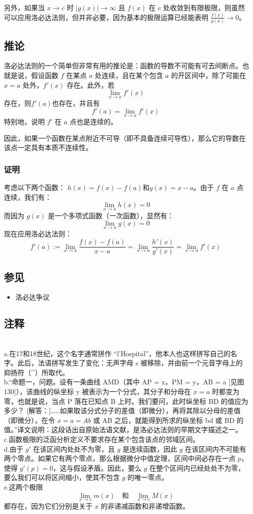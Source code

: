 另外，如果当 $x \to c$ 时 $|g(x)| \to \infty$ 且 $f(x)$ 在 $c$ 处收敛到有限极限，则虽然可以应用洛必达法则，但并非必要，因为基本的极限运算已经能表明 $\frac{f(x)}{g(x)} \to 0$。
\subsection{推论}
洛必达法则的一个简单但非常有用的推论是：函数的导数不可能有可去间断点。也就是说，假设函数 $f$ 在某点 $a$ 处连续，且在某个包含 $a$ 的开区间中，除了可能在 $x = a$ 处外，$f'(x)$ 存在。此外，若
$$
\lim_{x \to a} f'(x)~
$$
存在，则$f'(a)$也存在，并且有
$$
f'(a) = \lim_{x \to a} f'(x)~
$$
特别地，说明 $f'$ 在 $a$ 点也是连续的。

因此，如果一个函数在某点附近不可导（即不具备连续可导性），那么它的导数在该点一定具有本质不连续性。
\subsubsection{证明}
考虑以下两个函数： $h(x) = f(x) - f(a)$和$g(x) = x - a$。由于 $f$ 在 $a$ 点连续，我们有：
$$
\lim_{x \to a} h(x) = 0~
$$
而因为 $g(x)$ 是一个多项式函数（一次函数），显然有：
$$
\lim_{x \to a} g(x) = 0~
$$
现在应用洛必达法则：
$$
f'(a) := \lim_{x \to a} \frac{f(x) - f(a)}{x - a} = \lim_{x \to a} \frac{h'(x)}{g'(x)} = \lim_{x \to a} f'(x)~
$$
\subsection{参见}
\begin{itemize}
\item 洛必达争议
\end{itemize}
\subsection{注释}\\
a.在17和18世纪，这个名字通常拼作 “l'Hospital”，他本人也这样拼写自己的名字。此后，法语拼写发生了变化：无声字母 s 被移除，并由前一个元音字母上的抑扬符（^）所取代。\\
b.“命题一，问题。设有一条曲线 AMD（其中 AP = x，PM = y，AB = a [见图130]），该曲线的纵坐标 y 被表示为一个分式，其分子和分母在 $x = a$ 时都变为零，也就是说，当点 P 落在已知点 B 上时。我们要问，此时纵坐标 BD 的值应为多少？
[解答：]……如果取该分式分子的差值（即微分），再将其除以分母的差值（即微分），在令 $x = a = Ab$ 或 AB 之后，就能得到所求的纵坐标 bd 或 BD 的值。”译文说明：这段话出自原始法语文献，是洛必达法则的早期文字描述之一。\\
c.函数极限的泛函分析定义不要求存在某个包含该点的邻域区间。\\
d.由于 $g'$ 在该区间内处处不为零，且 $g$ 是连续函数，因此 $g$ 在该区间内不可能有两个零点。如果它有两个零点，那么根据微分中值定理，区间中间必存在一点 $p$，使得 $g'(p) = 0$，这与假设矛盾。因此，要么 $g$ 在整个区间内已经处处不为零，要么我们可以将区间缩小，使其不包含 $g$ 的唯一零点。\\
e.这两个极限
$$
\lim_{x \to c} m(x) \quad \text{和} \quad \lim_{x \to c} M(x)~
$$
都存在，因为它们分别是关于 $x$ 的非递减函数和非递增函数。

